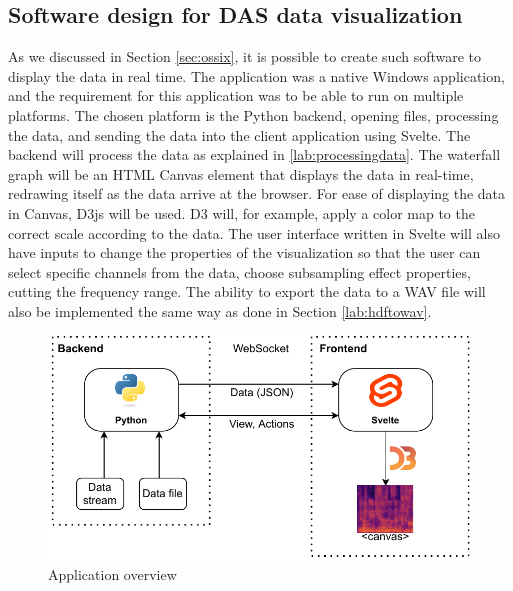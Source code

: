 





\subsection{Software design for DAS data visualization}

As we discussed in Section \ref{sec:ossix}, it is possible to create such software to display the data in real time. The application was a native Windows application, and the requirement for this application was to be able to run on multiple platforms. The chosen platform is the Python backend, opening files, processing the data, and sending the data into the client application using Svelte. The backend will process the data as explained in \ref{lab:processingdata}. The waterfall graph will be an HTML Canvas element that displays the data in real-time, redrawing itself as the data arrive at the browser. For ease of displaying the data in Canvas, D3js will be used. D3 will, for example, apply a color map to the correct scale according to the data. The user interface written in Svelte will also have inputs to change the properties of the visualization so that the user can select specific channels from the data, choose subsampling effect properties, cutting the frequency range. The ability to export the data to a WAV file will also be implemented the same way as done in Section \ref{lab:hdftowav}.

\begin{figure}
    \centering
    \includegraphics{obrazky/appstack.drawio.pdf}
    \caption{Application overview}
    \label{fig:app_overview}
\end{figure}

